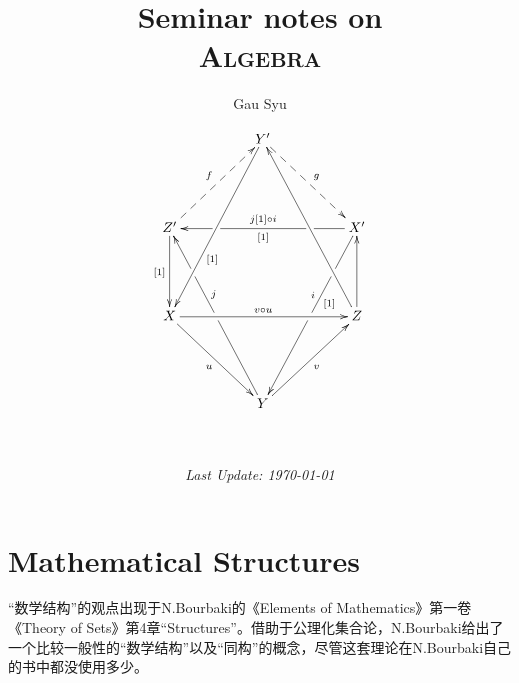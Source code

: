 %
%
%
%

%
%

%
%
%
%
\title{{\giant Seminar notes on}\\ \Giant\textsc{Algebra}}
\author{Gau Syu}
\date{
  \begin{gather*}
    \xymatrix@=5em{
    & Y' \ar@{-->}[dr]^g \ar[ddl]^(0.65){[1]} & \\
    Z' \ar@{-->}[ur]^f \ar[d]_{[1]} & &
        X' \ar[ll]_{j[1] \circ i}^{[1]}|(0.25)\hole|(0.75)\hole
           \ar[ddl]_(0.4)i^(0.4){[1]}|(0.25)\hole|(0.5)\hole \\
    X \ar[rr]^{v \circ u} \ar[dr]_u & &
        Z \ar[u] \ar[uul]\\
   & Y \ar[ur]_v \ar[uul]_(0.6)j|(0.5)\hole|(0.75)\hole &
    }\\
    \\
    \\
  \end{gather*}
\emph{\small Last Update: \today}}


\frontmatter
\maketitle
\dominitoc

\tableofcontents
\mainmatter
\pagestyle{plain}
\setcounter{minitocdepth}{2}
\part{Mathematical Structures}
  “数学结构”的观点出现于N.Bourbaki的《Elements of Mathematics》第一卷《Theory of Sets》第4章“Structures”。借助于公理化集合论，N.Bourbaki给出了一个比较一般性的“数学结构”以及“同构”的概念，尽管这套理论在N.Bourbaki自己的书中都没使用多少。

